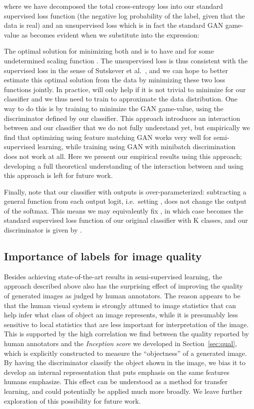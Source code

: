 \documentclass{article} \usepackage{nips14submit_e,times}
\newcommand{\secc}[1]{Section~\ref{sec:#1}}
\begin{document}
where we have decomposed the total cross-entropy loss into our standard supervised loss function  (the negative log probability of the label, given that the data is real) and an unsupervised loss  which is in fact the standard GAN game-value as becomes evident when we substitute  into the expression:
 
The optimal solution for minimizing both  and  is to have  and  for some undetermined scaling function . The unsupervised loss is thus consistent with the supervised loss in the sense of Sutskever et al.~\cite{sutskever2015towards}, and we can hope to better estimate this optimal solution from the data by minimizing these two loss functions jointly. In practice,  will only help if it is not trivial to minimize for our classifier and we thus need to train  to approximate the data distribution. One way to do this is by training  to minimize the GAN game-value, using the discriminator  defined by our classifier. This approach introduces an interaction between  and our classifier that we do not fully understand yet, but empirically we find that optimizing  using feature matching GAN works very well for semi-supervised learning, while training  using GAN with minibatch discrimination does not work at all. Here we present our empirical results using this approach; developing a full theoretical understanding of the interaction between  and  using this approach is left for future work.

Finally, note that our classifier with  outputs is over-parameterized: subtracting a general function  from each output logit, i.e.\ setting , does not change the output of the softmax. This means we may equivalently fix , in which case  becomes the standard supervised loss function of our original classifier with K classes, and our discriminator  is given by .

\subsection{Importance of labels for image quality}
Besides achieving state-of-the-art results in semi-supervised learning, the approach described above also has the surprising effect of improving the quality of generated images as judged by human annotators. The reason appears to be that the human visual system is strongly attuned to image statistics that can help infer what class of object an image represents, while it is presumably less sensitive to local statistics that are less important for interpretation of the image. This is supported by the high correlation we find between the quality reported by human annotators and the \emph{Inception score} we developed in \secc{qual}, which is explicitly constructed to measure the ``objectness'' of a generated image. By having the discriminator  classify the object shown in the image, we bias it to develop an internal representation that puts emphasis on the same features humans emphasize. This effect can be understood as a method for transfer learning, and could potentially be applied much more broadly. We leave further exploration of this possibility for future work.
\end{document}
